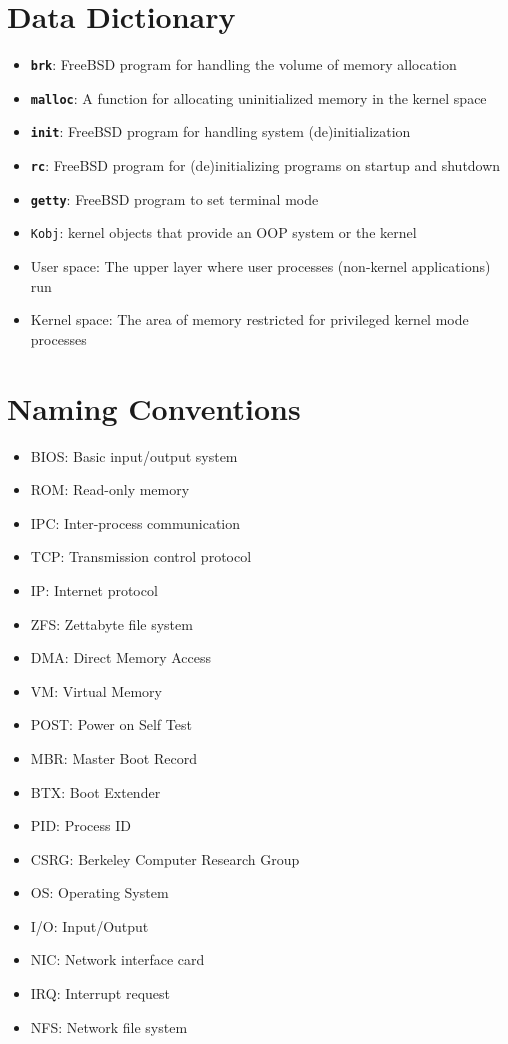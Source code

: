 \documentclass[12pt, dvipsnames, a4paper]{article}
\newcommand{\code}[1]{\texttt{#1}}
\newcommand{\bcode}[1]{\texttt{\textbf{#1}}}
\begin{document}
\section{Data Dictionary}
\begin{itemize}
	\item{\bcode{brk}: FreeBSD program for handling the volume of memory allocation}
	\item{\bcode{malloc}: A function for allocating uninitialized memory in the kernel space}
	\item{\bcode{init}: FreeBSD program for handling system (de)initialization}
	\item{\bcode{rc}: FreeBSD program for (de)initializing programs on startup and shutdown}
	\item{\bcode{getty}: FreeBSD program to set terminal mode}
	\item{\code{Kobj}: kernel objects that provide an OOP system or the kernel}
	\item{User space: The upper layer where user processes (non-kernel applications) run}
	\item{Kernel space: The area of memory restricted for privileged kernel mode processes}
\end{itemize}

\section{Naming Conventions}
\begin{itemize}
	\item{BIOS: Basic input/output system }
	\item{ROM: Read-only memory}
	\item{IPC: Inter-process communication}
	\item{TCP: Transmission control protocol}
	\item{IP: Internet protocol}
	\item{ZFS: Zettabyte file system}
	\item{DMA: Direct Memory Access}
	\item{VM: Virtual Memory}
	\item{POST: Power on Self Test}
	\item{MBR: Master Boot Record}
	\item{BTX: Boot Extender}
	\item{PID: Process ID}
	\item{CSRG: Berkeley Computer Research Group}
	\item{OS: Operating System}
	\item{I/O: Input/Output}
	\item{NIC: Network interface card}
	\item{IRQ: Interrupt request}
	\item{NFS: Network file system}
\end{itemize}
\clearpage
\end{document}
